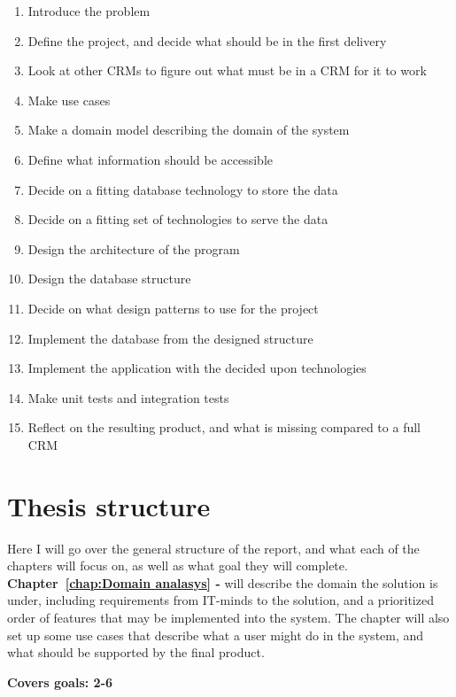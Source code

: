 \begin{enumerate}
  \item Introduce the problem
  \item Define the project, and decide what should be in the first delivery
  \item Look at other CRMs to figure out what must be in a CRM for it to work
  \item Make use cases
  \item Make a domain model describing the domain of the system
  \item Define what information should be accessible
  \item Decide on a fitting database technology to store the data
  \item Decide on a fitting set of technologies to serve the data
  \item Design the architecture of the program
  \item Design the database structure
  \item Decide on what design patterns to use for the project
  \item Implement the database from the designed structure
  \item Implement the application with the decided upon technologies
  \item Make unit tests and integration tests
  \item Reflect on the resulting product, and what is missing compared to a full CRM
\end{enumerate}

\section{Thesis structure}
\label{sec:Thesis structure}
Here I will go over the general structure of the report, and what each of the chapters will focus on, as well as what goal they will complete.\\

\textbf{Chapter~\ref{chap:Domain analasys} - } will describe the domain the solution is under, including requirements from IT-minds to the solution, and a prioritized order of features that may be implemented into the system. The chapter will also set up some use cases that describe what a user might do in the system, and what should be supported by the final product.

\textbf{Covers goals: 2-6}\\

